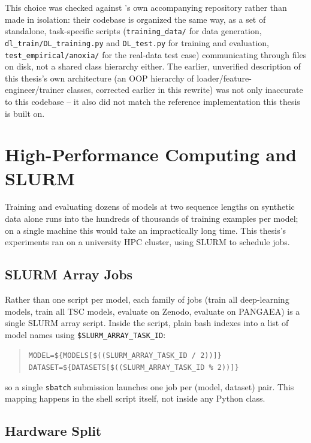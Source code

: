 This choice was checked against \citet{bury2021}'s own accompanying repository \citep{burygithub} rather than made in isolation: their codebase is organized the same way, as a set of standalone, task-specific scripts (\texttt{training\_data/} for data generation, \texttt{dl\_train/DL\_training.py} and \texttt{DL\_test.py} for training and evaluation, \texttt{test\_empirical/anoxia/} for the real-data test case) communicating through files on disk, not a shared class hierarchy either. The earlier, unverified description of this thesis's own architecture (an OOP hierarchy of loader/feature-engineer/trainer classes, corrected earlier in this rewrite) was not only inaccurate to this codebase -- it also did not match the reference implementation this thesis is built on.

\section{High-Performance Computing and SLURM}
\label{sec:hpc}

Training and evaluating dozens of models at two sequence lengths on synthetic data alone runs into the hundreds of thousands of training examples per model; on a single machine this would take an impractically long time. This thesis's experiments ran on a university HPC cluster, using SLURM \citep{yoo2003slurm} to schedule jobs.

\subsection{SLURM Array Jobs}

Rather than one script per model, each family of jobs (train all deep-learning models, train all TSC models, evaluate on Zenodo, evaluate on PANGAEA) is a single SLURM array script. Inside the script, plain bash indexes into a list of model names using \texttt{\$SLURM\_ARRAY\_TASK\_ID}:
\begin{quote}
\texttt{MODEL=\$\{MODELS[\$((SLURM\_ARRAY\_TASK\_ID / 2))]\}} \\
\texttt{DATASET=\$\{DATASETS[\$((SLURM\_ARRAY\_TASK\_ID \% 2))]\}}
\end{quote}
so a single \texttt{sbatch} submission launches one job per (model, dataset) pair. This mapping happens in the shell script itself, not inside any Python class.

\subsection{Hardware Split}

